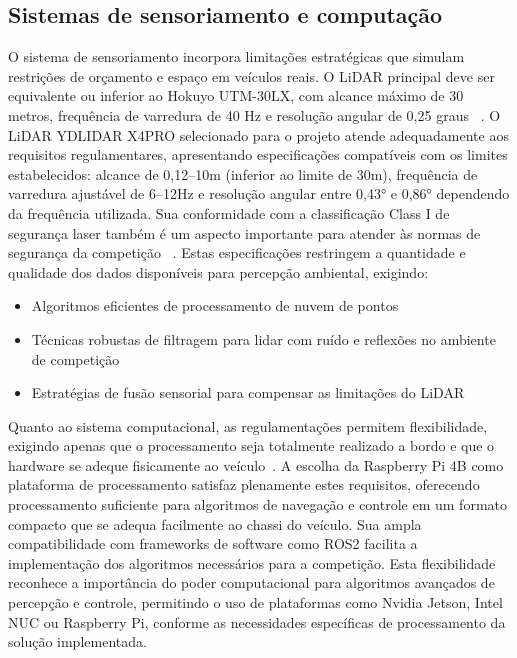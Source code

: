 \subsection{Sistemas de sensoriamento e computação}

O sistema de sensoriamento incorpora limitações estratégicas que simulam
restrições de orçamento e espaço em veículos reais. O LiDAR principal deve ser
equivalente ou inferior ao Hokuyo UTM-30LX, com alcance máximo de 30 metros,
frequência de varredura de 40 Hz e resolução angular de 0,25 graus
~\cite{GopalarathnamF1TENTH2022}. O LiDAR YDLIDAR X4PRO selecionado para o
projeto atende adequadamente aos requisitos regulamentares, apresentando
especificações compatíveis com os limites estabelecidos: alcance de 0,12--10m
(inferior ao limite de 30m), frequência de varredura ajustável de 6--12Hz e
resolução angular entre 0,43° e 0,86° dependendo da frequência utilizada. Sua
conformidade com a classificação Class I de segurança laser também é um aspecto
importante para atender às normas de segurança da competição
~\cite{F1TENTHRules2023}. Estas especificações restringem a quantidade e
qualidade dos dados disponíveis para percepção ambiental, exigindo:

\begin{itemize}
      \item Algoritmos eficientes de processamento de nuvem de pontos
      \item Técnicas robustas de filtragem para lidar com ruído e reflexões no ambiente de
            competição
      \item Estratégias de fusão sensorial para compensar as limitações do LiDAR
\end{itemize}

Quanto ao sistema computacional, as regulamentações permitem flexibilidade,
exigindo apenas que o processamento seja totalmente realizado a bordo e que o
hardware se adeque fisicamente ao veículo~\cite{F1TENTHRules2023}. A escolha da
Raspberry Pi 4B como plataforma de processamento satisfaz plenamente estes
requisitos, oferecendo processamento suficiente para algoritmos de navegação e
controle em um formato compacto que se adequa facilmente ao chassi do veículo.
Sua ampla compatibilidade com frameworks de software como ROS2 facilita a
implementação dos algoritmos necessários para a competição. Esta flexibilidade
reconhece a importância do poder computacional para algoritmos avançados de
percepção e controle, permitindo o uso de plataformas como Nvidia Jetson, Intel
NUC ou Raspberry Pi, conforme as necessidades específicas de processamento da
solução implementada.

